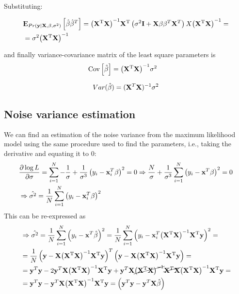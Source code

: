 Substituting:

\begin{equation}
\begin{aligned}
&\E_{Pr(\y|\X,\beta, \sigma^2)}\left[ \hb\hb^T\right] = \HM \left(\sigma^2 \mathbf{I} +\X\beta \beta^T\X^T\right)X \inv   = \\
 &=\sigma^2 \inv 
\end{aligned}
\end{equation}

and finally variance-covariance matrix of the least square parameters is 
\begin{equation}
\begin{aligned}
&\Cov\left[ \hb\right]=  \inv  \sigma^2
\end{aligned}
\end{equation}
 
\begin{align}
Var(\hat{\beta}) = (\X^T\X)^{-1} \sigma^2
\end{align}

\subsection{Noise variance estimation}
We can find an estimation of the noise variance from the maximum likelihood model using the same procedure used to find the parameters, i.e., taking the derivative and equating it to $0$:
\begin{equation}
\begin{aligned}
\label{varErr}
&\frac{\partial \log L}{\partial \sigma} = \sum_{i=1}^N-\frac{1}{\sigma} +\frac{1}{\sigma^3} \left(y_i - \x_i^T\beta\right)^2 = 0 \Rightarrow \frac{N}{\sigma} +\frac{1}{\sigma^3}  \sum_{i=1}^N\left(y_i - \x^T\beta\right)^2 = 0\\
&\Rightarrow \hat{\sigma^2} = \frac{1}{N}\sum_{i=1}^N\left(y_i - \x_i^T\beta\right)^2 
\end{aligned}
\end{equation}
This can be re-expressed as
\begin{equation}
\begin{aligned}
&\Rightarrow \hat{\sigma^2} = \frac{1}{N}\sum_{i=1}^N\left(y_i - \x^T\hb\right)^2  = \frac{1}{N}\sum_{i=1}^N\left(y_i - \x_i^T\HM\y\right)^2 = \\
&= \frac{1}{N}\left(\y - \X\HM\y\right)^T\left(\y - \X\HM\y\right) = \\
&=\y^T\y  - 2 \y^T  \X\HM\y + \y^T \X \cancel{\inv} \cancel{\X^T \X}\HM\y = \\
&=\y^T\y  - \y^T  \X\HM\y  = \left(\y^T\y - \y^T\X\hb \right)
\end{aligned}
\end{equation}

